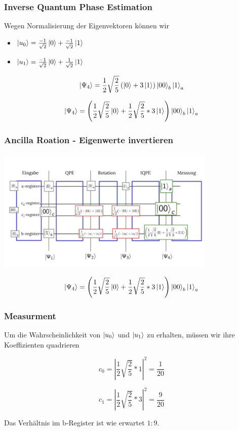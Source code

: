 \begin{frame}
    \frametitle{Inverse Quantum Phase Estimation}

Wegen Normalisierung der Eigenvektoren können wir 

\begin{itemize}
    \item $ \ket{u_0} = \frac{-1}{\sqrt{2}}\ket{0} + \frac{-1}{\sqrt{2}}\ket{1}$ 
    \item $ \ket{u_1}= \frac{-1}{\sqrt{2}}\ket{0} + \frac{1}{\sqrt{2}}\ket{1}$ 
\end{itemize}

$$ \ket{\Psi_4}= \frac{1}{2}\sqrt{\frac{2}{5}} \left( \ket{0} + 3\ket{1} \right)  \ket{00}_b \ket{1}_a $$

$$ \ket{\Psi_4}= \left(\frac{1}{2}\sqrt{\frac{2}{5}} \ket{0} +\frac{1}{2}\sqrt{\frac{2}{5}} * 3 \ket{1} \right) \ket{00}_b \ket{1}_a $$

\end{frame}

\begin{frame}
    \frametitle{Ancilla Roation - Eigenwerte invertieren}
    \begin{center}
    \includegraphics[width=10.5cm]{img/example_circuit/example_circuit_4.jpg}
    \end{center}

$$ \ket{\Psi_4}= \left(\frac{1}{2}\sqrt{\frac{2}{5}} \ket{0} +\frac{1}{2}\sqrt{\frac{2}{5}} * 3 \ket{1} \right) \ket{00}_b \ket{1}_a$$
\end{frame}


\begin{frame}
    \frametitle{Measurment}

Um die Wahrscheinlichkeit von $ \ket{u_0}$ und $\ket{u_1}$ zu erhalten, müssen wir ihre Koeffizienten quadrieren

$$ c_0=\left|\frac{1}{2}\sqrt{\frac{2}{5}}*1\right|^2 = \frac{1}{20} $$

$$ c_1=\left|\frac{1}{2}\sqrt{\frac{2}{5}}*3\right|^2 = \frac{9}{20} $$

Das Verhältnis im b-Register ist wie erwartet $1:9$.

\end{frame}



